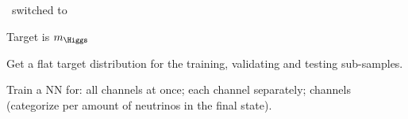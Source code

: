 \begin{frame}
\manip \GeV\ switched to \TeV

\manip Target is $m_{\Higgs}$

\manip Get a flat target distribution for the training, validating and testing sub-samples.

\manip Train a NN for:
\submanip all channels at once;
\submanip each channel separately;
\submanip {} channels (categorize per amount of neutrinos in the final state).
\end{frame}